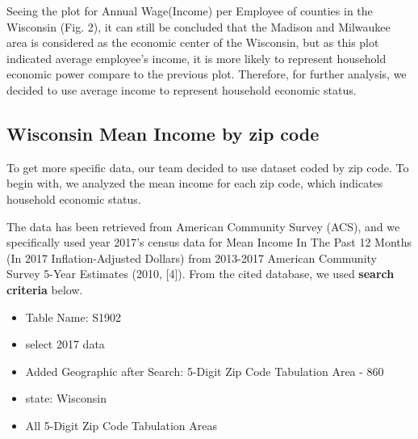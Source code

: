 \documentclass[letterpaper, 10 pt, conference]{ieeeconf}  %
\begin{document}
Seeing the plot for Annual Wage(Income) per Employee of counties in the Wisconsin (Fig. 2), it can still be concluded that the Madison and Milwaukee area is considered as the economic center of the Wisconsin, but as this plot indicated average employee's income, it is more likely to represent household economic power compare to the previous plot.
Therefore, for further analysis, we decided to use average income to represent household economic status.

\subsection{Wisconsin Mean Income by zip code}

To get more specific data, our team decided to use dataset coded by zip code.
To begin with, we analyzed the mean income for each zip code, which indicates household economic status.

The data has been retrieved from American Community Survey (ACS), and we specifically used year 2017's census data for Mean Income In The Past 12 Months (In 2017 Inflation-Adjusted Dollars) from 2013-2017 American Community Survey 5-Year Estimates (2010, [4]).
From the cited database, we used \textbf{search criteria} below.

\begin{itemize}

\item Table Name: S1902
\item select 2017 data
\item Added Geographic after Search: 5-Digit Zip Code Tabulation Area - 860
\item state: Wisconsin
\item All 5-Digit Zip Code Tabulation Areas

\end{itemize}
\vspace{1\baselineskip}
\end{document}

